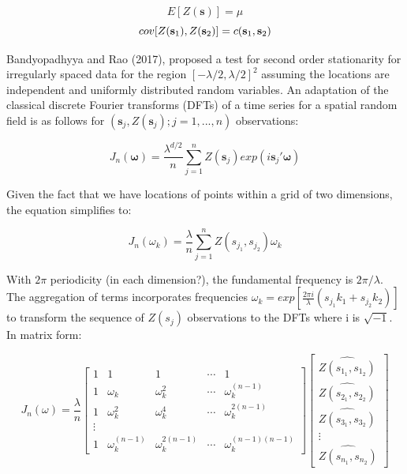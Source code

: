 \documentclass[print]{nuthesis}
\begin{document}
\begin{equation}
  E[Z(\textbf{s})]=\mu 
\end{equation} \begin{equation}
  cov[{Z(\textbf{s}_\text1),Z(\textbf{s}_\text2)}]=c(\textbf{s}_\text1, \textbf{s}_\text2) 
\end{equation}

Bandyopadhyya and Rao (2017), proposed a test for second order stationarity for irregularly spaced data for the region \([-\lambda/2, \lambda/2]^\text{2}\) assuming the locations are independent and uniformly distributed random variables. An adaptation of the classical discrete Fourier transforms (DFTs) of a time series for a spatial random field is as follows for \((\textbf{s}_j,Z(\textbf{s}_j); j = 1,...,n)\) observations:

\begin{equation}
  J_n(\boldsymbol{\omega})=\frac{\lambda^{d/2}}{n}\sum_{j=1}^{n}Z(\textbf{s}_j)exp(i\textbf{s}_j'\boldsymbol{\omega}) 
\end{equation}

Given the fact that we have locations of points within a grid of two dimensions, the equation simplifies to:

\begin{equation}
  J_n(\omega_k)=\frac{\lambda}{n}\sum_{j=1}^{n}Z(s_{j_1}, s_{j_2})\omega_k 
\end{equation}

With \(2\pi\) periodicity (in each dimension?), the fundamental frequency is \(2\pi/\lambda\). The aggregation of terms incorporates frequencies \(\omega_k = exp[\frac{2\pi i}{\lambda}(s_{j_1}k_1+s_{j_2}k_2)]\) to transform the sequence of \(Z(s_j)\) observations to the DFTs where i is \(\sqrt{-1}\). In matrix form:

\begin{equation}
  J_n(\omega) = \frac{\lambda}{n}
 \begin{bmatrix}
    1 & 1 & 1 & \cdots & 1 \\
    1 & \omega_k & \omega_k^2 & \cdots & \omega_k^{(n-1)} \\
    1 & \omega_k^2 & \omega_k^4 & \cdots & \omega_k^{2(n-1)} \\
    \vdots \\
    1 & \omega_k^{(n-1)} & \omega_k^{2(n-1)} & \cdots & \omega_k^{(n-1)(n-1)} 
  \end{bmatrix}
  \begin{bmatrix}
      \hat{Z(s_{1_1}, s_{1_2})} \\
      \hat{Z(s_{2_1}, s_{2_2})} \\
      \hat{Z(s_{3_1}, s_{3_2})} \\
      \vdots \\
      \hat{Z(s_{n_1}, s_{n_2})}
  \end{bmatrix}
\end{equation}
\end{document}

